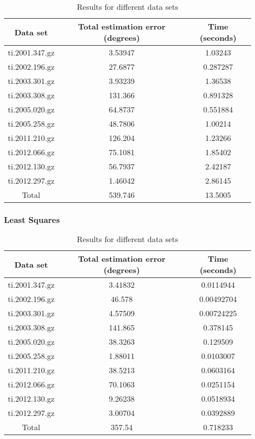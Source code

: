 \begin{table}[h!]
	\centering
	\def\arraystretch{1.2}
	\begin{tabular}{|c c c|} 
		\hline
		Data set & Total estimation error (degrees) & Time (seconds) \\ [0.5ex] 
		\hline\hline
		ti.2001.347.gz & 3.53947 & 1.03243 \\
		\hline
		ti.2002.196.gz & 27.6877 & 0.287287 \\
		\hline
		ti.2003.301.gz & 3.93239 & 1.36538 \\
		\hline
		ti.2003.308.gz & 131.366 & 0.891328 \\
		\hline
		ti.2005.020.gz & 64.8737 & 0.551884 \\
		\hline
		ti.2005.258.gz & 48.7806 & 1.00214 \\
		\hline
		ti.2011.210.gz & 126.204 & 1.23266 \\
		\hline
		ti.2012.066.gz & 75.1081 & 1.85402 \\
		\hline
		ti.2012.130.gz & 56.7937 & 2.42187 \\
		\hline
		ti.2012.297.gz & 1.46042 & 2.86145 \\
		\hline
		\hline
		Total & 539.746 & 13.5005 \\
		\hline
	\end{tabular}
	\caption{Results for different data sets}
\end{table}

\subsubsection{Least Squares}

\begin{table}[h!]
	\centering
	\def\arraystretch{1.2}
	\begin{tabular}{|c c c|} 
		\hline
		Data set & Total estimation error (degrees) & Time (seconds) \\ [0.5ex] 
		\hline\hline
		ti.2001.347.gz & 3.41832 & 0.0114944 \\
		\hline
		ti.2002.196.gz & 46.578 & 0.00492704 \\
		\hline
		ti.2003.301.gz & 4.57509 & 0.00724225 \\
		\hline
		ti.2003.308.gz & 141.865 & 0.378145 \\
		\hline
		ti.2005.020.gz & 38.3263 & 0.129509 \\
		\hline
		ti.2005.258.gz & 1.88011 & 0.0103007 \\
		\hline
		ti.2011.210.gz & 38.5213 & 0.0603164 \\
		\hline
		ti.2012.066.gz & 70.1063 & 0.0251154 \\
		\hline
		ti.2012.130.gz & 9.26238 & 0.0518934 \\
		\hline
		ti.2012.297.gz & 3.00704 & 0.0392889 \\
		\hline\hline
		Total & 357.54 & 0.718233 \\
		\hline
	\end{tabular}
	\caption{Results for different data sets}
\end{table}

